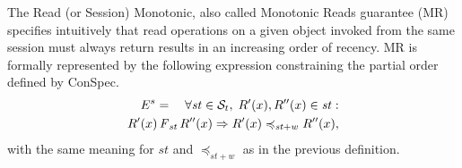 \documentclass[journal,compsoc]{IEEEtran}
\begin{document}
\par The Read (or Session) Monotonic, also called Monotonic Reads guarantee (MR) specifies intuitively that read operations on a given object invoked from the same session must always return results in an increasing order of recency.   MR is formally represented by the following expression constraining the partial order defined by ConSpec.
\begin{align}\label{eqn:MR}
\begin{split}
 E^{s} =  \quad \forall \mathit{st} \in \mathcal{S}_t,\;  {R}'(x), {R}''(x) \in \mathit{st} : \\
  {R}'(x) \operatorname{\it F}_\mathit{st} {R}''(x)
 \Rightarrow {R}'(x) \preccurlyeq_{\mathit{st}+w} {R}''(x) , 
\end{split}
\end{align} with the same meaning for $\mathit{st}$ and $\preccurlyeq_{\mathit{st}+w}$ as in the previous definition.
\end{document}
